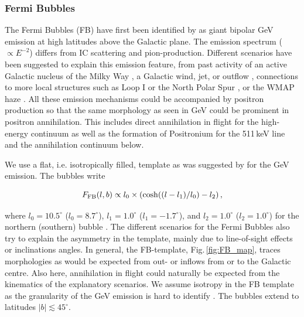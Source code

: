 \documentclass[doublespace,nopageskip]{VTthesis}
\newcommand{\mrm}[1]{\mathrm{#1}}
\begin{document}
\subsubsection{Fermi Bubbles}

The Fermi Bubbles ({FB}) have first been identified by \citet{2010ApJ...724.1044S} as giant bipolar GeV emission at high latitudes above the Galactic plane.
%
The emission spectrum ($\propto E^{-2}$) differs from IC scattering and pion-production.
%
Different scenarios have been suggested to explain this emission feature, from past activity of an active Galactic nucleus of the Milky Way \citep{2010ApJ...724.1044S,2012MNRAS.424..666Z,2012ApJ...756..181G,2017ApJ...850....2Y}, a Galactic wind, jet, or outflow \citep{2012MNRAS.423.3512C,2015MNRAS.453.3827S,2014MNRAS.444L..39L}, connections to more local structures such as Loop I or the North Polar Spur \citep{2013ApJ...779...57K,2015MNRAS.447.3824S,2014ApJ...793...64A}, or the WMAP haze \citep{2012ApJ...750...17D,2014ApJ...793...64A,2015ApJ...808..107C}.
%
All these emission mechanisms could be accompanied by positron production so that the same morphology as seen in GeV could be prominent in positron annihilation.
%
This includes direct annihilation in flight for the high-energy continuum as well as the formation of Positronium for the 511\,keV line and the annihilation continuum below.

We use a flat, i.e. isotropically filled, template as was suggested by \citet{2018NatAs...2..387M} for the GeV emission.
%
The bubbles write

\begin{equation}
	F_{\rm FB}(l,b) \propto l_0 \times \left( \cosh((l-l_1)/l_0) - l_2 \right)\mrm{,}
	\label{eq:FB_formula}
\end{equation}

\noindent where $l_0 = 10.5^{\circ}$ ($l_0 = 8.7^{\circ}$), $l_1 = 1.0^{\circ}$ ($l_1 = -1.7^{\circ}$), and $l_2 = 1.0^{\circ}$ ($l_2 = 1.0^{\circ}$) for the northern (southern) bubble \citep{2016ApJS..223...26A}.
%
The different scenarios for the Fermi Bubbles also try to explain the asymmetry in the template, mainly due to line-of-sight effects or inclinations angles.
%
In general, the {FB}-template, Fig.\,\ref{fig:FB_map}, traces morphologies as would be expected from out- or inflows from or to the Galactic centre.
%
Also here, annihilation in flight could naturally be expected from the kinematics of the explanatory scenarios.
%
We assume isotropy in the {FB} template as the granularity of the GeV emission is hard to identify \citep{2014ApJ...793...64A}.
%
The bubbles extend to latitudes $|b| \lesssim 45^{\circ}$.
\end{document}

